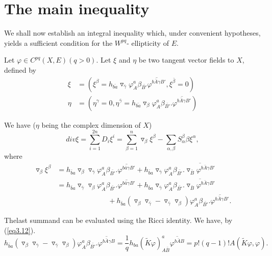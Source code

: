 \section{The main inequality}%

We shall now establish an integral inequality which, under convenient
hypotheses, yields a sufficient condition for the $W^{pq}$-
ellipticity of $E$. 

Let $\varphi \in C^{pq}(X,E)(q > 0)$. Let $\xi$ and  $\eta$ be two
tangent vector fields to $X$, defined by 
\begin{align*}
  \xi & = (\xi^{\beta}=h_{\bar {ba}}\triangledown_{\bar
  {\gamma}}\varphi^{a}_{A}\beta_{\bar
  {B'}}\overline{\varphi^{b\bar{A}\gamma B'}},\xi^ {\bar{\beta}}=0)\\
  \eta & =(\eta^{\gamma}=0,
  \eta^{\bar{\gamma}}=h_{\bar{ba}} \triangledown_{\beta} \varphi^{a}_{A}
  \beta_{\bar{B'}}.\overline{\varphi^{b\bar{A}\gamma
      B'}}) 
\end{align*}

We have ($\eta $ being the complex dimension of $X$)
$$ 
div \xi = \displaystyle \sum_{i=1}^{2n} D_{i}
\xi^{i}=\sum^{n}_{\beta=1}\triangledown_{\beta}\xi^{\beta}-\sum_{\alpha,\beta}
S^\beta_{\alpha} \beta \xi^{\alpha},
$$ 
where
\begin{align*}
  \triangledown_{\beta}\xi^{\beta} & = h_{\bar{b}a}
  \triangledown_{\beta} \triangledown_{\bar{\gamma}} \varphi^{a}_{A}
  \beta_{\bar{B'}}. \overline{\varphi^{b\bar{a}\gamma B'}}+
  h_{\bar{b}a}\triangledown_{\bar{\gamma}}
  \varphi^{a}_{A}\beta_{\bar{B'}}. \overline{\triangledown_{\bar{B}} 
    \varphi^{b\bar{A}\gamma B'}}\\ 
& =h_{\bar{b}a}\triangledown_{\bar{\gamma}} \triangledown_{\beta}
  \varphi^{a}_{A} \beta_{\bar{B'}}. \overline{\varphi^{b\bar{a}\gamma B'}}+
  h_{\bar{b}a}\triangledown_{\bar{\gamma}} \varphi^{a}_{A}
  \beta_{\bar{B'}}. \overline{\triangledown_{\bar{B}} \varphi^{b\bar
      {A}\gamma B'}}\\   
 & \hspace{3cm} +h_{\bar{b}a}(\triangledown_{\beta} \triangledown_{\bar{\gamma}} -
  \triangledown_{\bar{\gamma}} \triangledown_{\beta}) \varphi^{a}_{A}
  \beta_{\bar{B'}}. \overline{\varphi^{b \bar{A} \gamma B'}}.
\end{align*}

The\pageoriginale last summand can be evaluated using the Ricci
identity. We have, by (\ref{eq3.12}).   
$$ 
h_{\bar{b}a}(\triangledown_{\beta} \triangledown_{\bar{\gamma}} - 
\triangledown_{\bar{\gamma}} \triangledown_{\beta})
\varphi^{a}_{A}\beta_{\bar{B'}}.\overline{\varphi^{b \bar{A}\gamma
    B}}=\frac{1}{q}
h_{ba}(\tilde{K}\varphi)^{a}_{A\bar{B}}\overline{\varphi^{b
    \bar{A}B}}= p!(q-1)! A(\tilde{K}\varphi,\varphi).
$$


